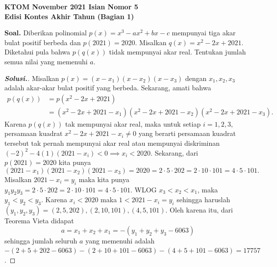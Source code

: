 \begin{center}
    \textbf{\Huge KTOM November 2021 Isian Nomor 5}\\
    \textbf{\large Edisi Kontes Akhir Tahun (Bagian 1)}
\end{center}


\noindent

  \textbf{Soal.} Diberikan polinomial $p(x)=x^3-ax^2+bx-c$ mempunyai tiga akar bulat positif berbeda dan $p(2021)=2020$. Misalkan $q(x)=x^2-2x+2021$. Diketahui pula bahwa $p(q(x))$ tidak mempunyai akar real. Tentukan jumlah semua nilai yang memenuhi $a$.
  \newpage
  	 \begin{proof}[\textbf{Solusi.}]
  	 Misalkan $p(x)=(x-x_1)(x-x_2)(x-x_3)$ dengan $x_1,x_2,x_3$ adalah akar-akar bulat positif yang berbeda.  Sekarang, amati bahwa
  	 \begin{align*}
  	 p(q(x))&=p(x^2-2x+2021)\\
  	 &=(x^2-2x+2021-x_1)(x^2-2x+2021-x_2)(x^2-2x+2021-x_3).
  	 \end{align*}
  	  Karena $p(q(x))$ tak mempunyai akar real, maka  untuk setiap $i=1,2,3$, persamaan kuadrat $x^2-2x+2021-x_i \neq 0$ yang berarti persamaan kuadrat tersebut tak pernah mempunyai akar real atau mempunyai diskriminan $(-2)^2-4(1)(2021-x_i) < 0 \implies x_i < 2020$. Sekarang, dari $p(2021)=2020$ kita punya $$(2021-x_1)(2021-x_2)(2021-x_3)=2020=2\cdot 5 \cdot 202=2\cdot 10 \cdot 101=4\cdot 5 \cdot 101.$$  Misalkan $2021-x_i = y_i$ maka kita punya $y_1y_2y_3=2\cdot 5 \cdot 202=2\cdot 10 \cdot 101=4\cdot 5 \cdot 101$. WLOG $x_3 < x_2 < x_1$, maka $y_1 < y_2<y_3$. Karena $x_i < 2020$ maka $1 < 2021 - x_i = y_i$ sehingga haruslah $(y_1,y_2,y_3)=(2,5,202),(2,10,101),(4,5,101)$.
  	Oleh karena itu, dari Teorema Vieta didapat $$a=x_1+x_2+x_1=-(y_1+y_2+y_3-6063)$$ sehingga jumlah seluruh $a$ yang memenuhi adalah $-(2+5+202-6063)-(2+10+101-6063)-(4+5+101-6063)=\boxed{17757}$.
  	\end{proof}
